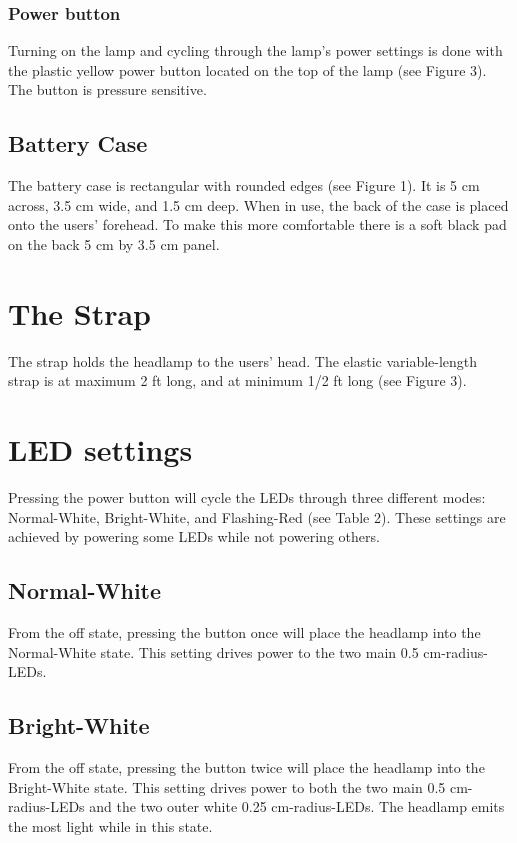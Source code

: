 \documentclass[12pt]{article}
\begin{document}
\subsubsection{Power button}
Turning on the lamp and cycling through the lamp's power settings is done with the plastic yellow
power button located on the top of the lamp (see Figure 3). The button is pressure sensitive.

\subsection{Battery Case}
The battery case is rectangular with rounded edges (see Figure 1). It is 5 cm across, 3.5 cm wide,
and 1.5 cm deep. When in use, the back of the case is placed onto the users' forehead. To make this
more comfortable there is a soft black pad on the back 5 cm by 3.5 cm panel.

\section{The Strap}
The strap holds the headlamp to the users' head. The elastic variable-length strap is at maximum 2 ft
long, and at minimum 1/2 ft long (see Figure 3).

\section{LED settings}
Pressing the power button will cycle the LEDs through three different modes: Normal-White,
Bright-White, and Flashing-Red (see Table 2). These settings are achieved by powering some LEDs while not
powering others.

\subsection{Normal-White}
From the off state, pressing the button once will place the headlamp into the Normal-White state.  This
setting drives power to the two main 0.5 cm-radius-LEDs.

\subsection{Bright-White}
From the off state, pressing the button twice will place the headlamp into the Bright-White state.
This setting drives power to both the two main 0.5 cm-radius-LEDs and the two outer white 0.25
cm-radius-LEDs. The headlamp emits the most light while in this state.
\end{document}
